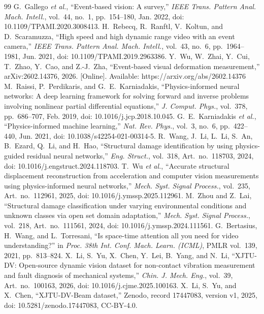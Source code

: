\documentclass[conference]{IEEEtran}
\begin{document}
\begin{thebibliography}{99}
 G.~Gallego \emph{et al.}, ``Event-based vision: A survey,'' \emph{IEEE Trans. Pattern Anal. Mach. Intell.}, vol.~44, no.~1, pp.~154--180, Jan. 2022, doi: 10.1109/TPAMI.2020.3008413.
 H.~Rebecq, R.~Ranftl, V.~Koltun, and D.~Scaramuzza, ``High speed and high dynamic range video with an event camera,'' \emph{IEEE Trans. Pattern Anal. Mach. Intell.}, vol.~43, no.~6, pp.~1964--1981, Jun. 2021, doi: 10.1109/TPAMI.2019.2963386.
 Y.~Wu, W.~Zhai, Y.~Cui, T.~Zhao, Y.~Cao, and Z.-J.~Zha, ``Event-based visual deformation measurement,'' arXiv:2602.14376, 2026. [Online]. Available: https://arxiv.org/abs/2602.14376
 M.~Raissi, P.~Perdikaris, and G.~E.~Karniadakis, ``Physics-informed neural networks: A deep learning framework for solving forward and inverse problems involving nonlinear partial differential equations,'' \emph{J. Comput. Phys.}, vol.~378, pp.~686--707, Feb. 2019, doi: 10.1016/j.jcp.2018.10.045.
 G.~E.~Karniadakis \emph{et al.}, ``Physics-informed machine learning,'' \emph{Nat. Rev. Phys.}, vol.~3, no.~6, pp.~422--440, Jun. 2021, doi: 10.1038/s42254-021-00314-5.
 R.~Wang, J.~Li, L.~Li, S.~An, B.~Ezard, Q.~Li, and H.~Hao, ``Structural damage identification by using physics-guided residual neural networks,'' \emph{Eng. Struct.}, vol.~318, Art.~no.~118703, 2024, doi: 10.1016/j.engstruct.2024.118703.
 T.~Wu \emph{et al.}, ``Accurate structural displacement reconstruction from acceleration and computer vision measurements using physics-informed neural networks,'' \emph{Mech. Syst. Signal Process.}, vol.~235, Art.~no.~112961, 2025, doi: 10.1016/j.ymssp.2025.112961.
 M.~Zhou and Z.~Lai, ``Structural damage classification under varying environmental conditions and unknown classes via open set domain adaptation,'' \emph{Mech. Syst. Signal Process.}, vol.~218, Art.~no.~111561, 2024, doi: 10.1016/j.ymssp.2024.111561.
 G.~Bertasius, H.~Wang, and L.~Torresani, ``Is space-time attention all you need for video understanding?'' in \emph{Proc. 38th Int. Conf. Mach. Learn. (ICML)}, PMLR vol.~139, 2021, pp.~813--824.
 X.~Li, S.~Yu, X.~Chen, Y.~Lei, B.~Yang, and N.~Li, ``XJTU-DV: Open-source dynamic vision dataset for non-contact vibration measurement and fault diagnosis of mechanical systems,'' \emph{Chin. J. Mech. Eng.}, vol.~39, Art.~no.~100163, 2026, doi: 10.1016/j.cjme.2025.100163.
 X.~Li, S.~Yu, and X.~Chen, ``XJTU-DV-Beam dataset,'' Zenodo, record 17447083, version v1, 2025, doi: 10.5281/zenodo.17447083, CC-BY-4.0.

\end{thebibliography}
\end{document}
